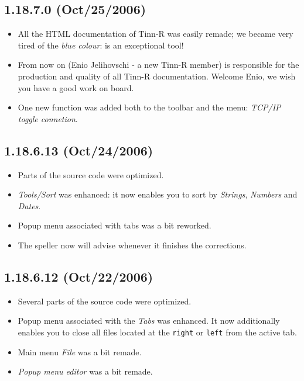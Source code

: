 \subsection{1.18.7.0 (Oct/25/2006)}

\begin{itemize}
  \item All the HTML documentation of Tinn-R was easily remade; we became
    very tired of the \textit{blue colour}:
    is an exceptional tool!
  \item From now on (Enio Jelihovschi - a new Tinn-R member) is 
    responsible for the production and quality of all Tinn-R documentation.
    Welcome Enio, we wish you have a good work on board.
  \item One new function was added both to the \RR{} toolbar and the \RR{}
    menu: \textit{TCP/IP toggle connetion}.
\end{itemize}


\subsection{1.18.6.13 (Oct/24/2006)}

\begin{itemize}
  \item Parts of the source code were optimized.
  \item \textit{Tools/Sort} was enhanced: it now enables you to sort by
    \textit{Strings}, \textit{Numbers} and \textit{Dates}.
  \item Popup menu associated with tabs was a bit reworked.
  \item The speller now will advise whenever it finishes the
    corrections.
\end{itemize}


\subsection{1.18.6.12 (Oct/22/2006)}

\begin{itemize}
  \item Several parts of the source code were optimized.
  \item Popup menu associated with the \textit{Tabs} was enhanced. It now
    additionally enables you to close all files located at the \texttt{right}
    or \texttt{left} from the active tab.
  \item Main menu \textit{File} was a bit remade.
  \item \textit{Popup menu editor} was a bit remade.
\end{itemize}


